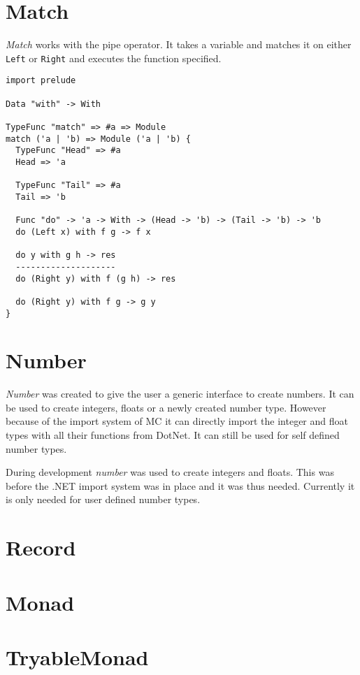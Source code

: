 \section{Match}
\emph{Match} works with the pipe operator.
It takes a variable and matches it on either \verb|Left| or \verb|Right| and executes the function specified.

\begin{lstlisting}
import prelude

Data "with" -> With

TypeFunc "match" => #a => Module
match ('a | 'b) => Module ('a | 'b) {
  TypeFunc "Head" => #a
  Head => 'a

  TypeFunc "Tail" => #a
  Tail => 'b

  Func "do" -> 'a -> With -> (Head -> 'b) -> (Tail -> 'b) -> 'b
  do (Left x) with f g -> f x

  do y with g h -> res
  --------------------
  do (Right y) with f (g h) -> res

  do (Right y) with f g -> g y
}
\end{lstlisting}
\section{Number}
\emph{Number} was created to give the user a generic interface to create numbers.
It can be used to create integers, floats or a newly created number type.
However because of the import system of MC it can directly import the integer and float types with all their functions from DotNet.
It can still be used for self defined number types.




During development \emph{number} was used to create integers and floats.
This was before the .NET import system was in place and it was thus needed.
Currently it is only needed for user defined number types.

\section{Record}
\section{Monad}
\section{TryableMonad}
